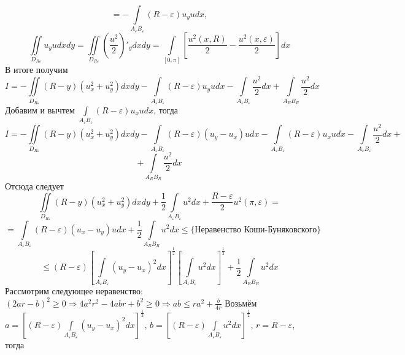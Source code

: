 \documentclass[12pt, a4paper]{article}
\begin{document}
	\begin{equation*}
		= - \int\limits_{A_\varepsilon B_\varepsilon} \left(R - \varepsilon \right) u_yu dx, 
	\end{equation*}
	\begin{equation*}
		\iint\limits_{D_{R\varepsilon}} u_y u dx dy = \iint\limits_{D_{R\varepsilon}} \left(\dfrac{u^2}{2}\right)'_ydx dy = \int\limits_{[0,\pi]} \left[\dfrac{u^2(x,R)}{2} - \dfrac{u^2(x, \varepsilon)}{2}\right] dx 
	\end{equation*}
	\newline
	В итоге получим
	\begin{equation*}
		I = - \iint\limits_{D_{R\varepsilon}} \left(R - y\right) \left(u_x^2 + u_y^2\right) dx dy
		- \int\limits_{A_\varepsilon B_\varepsilon} \left(R - \varepsilon\right) u_y u dx 
		-\int\limits_{A_\varepsilon B_\varepsilon} \dfrac{u^2}{2} dx + \int\limits_{A_R B_R} \dfrac{u^2}{2} dx 
	\end{equation*}
	Добавим и вычтем $\int\limits_{A_\varepsilon B_\varepsilon} \left(R - \varepsilon\right) u_x u dx$, тогда
	\begin{equation*}
		I = - \iint\limits_{D_{R\varepsilon}} \left(R - y\right) \left(u_x^2 + u_y^2\right) dx dy - 
		\int\limits_{A_\varepsilon B_\varepsilon} \left(R - \varepsilon \right) \left(u_y - u_x\right)u dx - \int\limits_{A_\varepsilon B_\varepsilon} \left(R - \varepsilon\right) u_x u dx - \int\limits_{A_\varepsilon B_\varepsilon}\dfrac{u^2}{2} dx +
	\end{equation*}
	\begin{equation*}
		+ \int\limits_{A_R B_R} \dfrac{u^2}{2}dx
	\end{equation*}
	Отсюда следует
	\begin{equation*}
		\iint\limits_{D_{R\varepsilon}} \left(R - y\right) \left(u_x^2 + u_y^2\right) dx dy + \dfrac{1}{2}\int\limits_{A_\varepsilon B_\varepsilon} u^2 dx +\dfrac{R - \varepsilon}{2}u^2(\pi, \varepsilon)  =
	\end{equation*}
	\begin{equation*}
		= \int\limits_{A_\varepsilon B_\varepsilon} \left(R - \varepsilon \right) \left(u_x - u_y\right)u dx + \dfrac12  \int\limits_{A_R B_R} u^2 dx \leq \{ \text{Неравенство Коши-Буняковского} \}
	\end{equation*}
	\begin{equation*}
		\leq \left(R - \varepsilon\right) \left[\int\limits_{A_\varepsilon B_\varepsilon} \left( u_y - u_x\right)^2 dx \right]^{\frac12} \left[\int\limits_{A_\varepsilon B_\varepsilon} u^2 dx \right]^{\frac12} + \dfrac12 \int\limits_{A_RB_R} u^2 dx
	\end{equation*}
	Рассмотрим следующее неравенство: \begin{math}
		\left(2ar -b\right)^2 \geq 0 \Rightarrow 4a^2 r^2 - 4 abr + b^2 \geq 0 \Rightarrow ab \leq r a^2 + \frac{b}{4r}
	\end{math}
	\newline
	Возьмём $ a = \left[ \left(R - \varepsilon \right) \int\limits_{A_\varepsilon B_\varepsilon} \left( u_y - u_x\right)^2 dx \right]^{\frac12}$, $ b = \left[\left(R - \varepsilon\right)\int\limits_{A_\varepsilon B_\varepsilon} u^2 dx \right]^{\frac12}$, $ r = R - \varepsilon$, тогда
	
\end{document}
